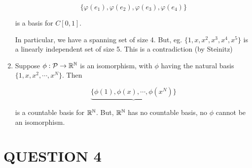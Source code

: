 \documentclass[a4paper]{article}
\begin{document}
\begin{enumerate}[label = (\alph*)]
		\[ \{ \varphi(e_{1}),\varphi(e_{2}),\varphi(e_{3}),\varphi(e_{4}) \} \]
		
		is a basis for $ C[0,1] $.
		
		In particular, we have a spanning set of size 4. But, eg. $ \{1,x,x^{2},x^{3},x^{4},x^{5}\} $ is a linearly independent set of size 5. This is a contradiction (by Steinitz)
		
		\item Suppose $ \phi : \mathcal{P} \to \mathbb{R}^{\mathbb{N}} $ is an isomorphism, with $ \phi $ having the natural basis $ \{  1,x,x^{2},\cdots,x^{N}\} $. Then

		\[ \underbrace{\{ \phi(1),\phi(x),\cdots,\phi(x^{N}) \}} \]
		
		is a countable basis for $ \mathbb{R}^{\mathbb{N}} $. But, $ \mathbb{R}^{\mathbb{N}} $ has no countable basis, no $ \phi $ cannot be an isomorphism. 
		
		
	\end{enumerate}
		
	\section{QUESTION 4}
	
\end{document}
